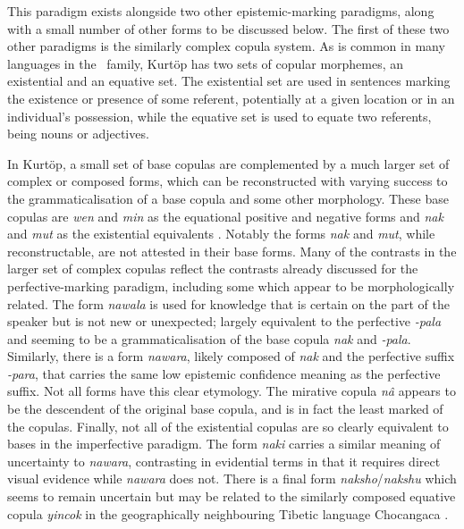 This paradigm exists alongside two other epistemic-marking paradigms, along with a small number of other forms to be discussed below. The first of these two other paradigms is the similarly complex copula system. As is common in many languages in the \lfam\ family, Kurtöp has two sets of copular morphemes, an existential and an equative set. The existential set are used in sentences marking the existence or presence of some referent, potentially at a given location or in an individual's possession, while the equative set is used to equate two referents, being nouns or adjectives.

In Kurtöp, a small set of base copulas are complemented by a much larger set of complex or composed forms, which can be reconstructed with varying success to the grammaticalisation of a base copula and some other morphology. These base copulas are \textit{wen} and \textit{min} as the equational positive and negative forms and \textit{nak} and \textit{mut} as the existential equivalents \cite[120]{Hyslop2014}. Notably the forms \textit{nak} and \textit{mut}, while reconstructable, are not attested in their base forms. Many of the contrasts in the larger set of complex copulas reflect the contrasts already discussed for the perfective-marking paradigm, including some which appear to be morphologically related. The form \textit{nawala} is used for knowledge that is certain on the part of the speaker but is not new or unexpected; largely equivalent to the perfective \textit{-pala} and seeming to be a grammaticalisation of the base copula \textit{nak} and \textit{-pala}. Similarly, there is a form \textit{nawara}, likely composed of \textit{nak} and the perfective suffix \textit{-para}, that carries the same low epistemic confidence meaning as the perfective suffix. Not all forms have this clear etymology. The mirative copula \textit{nâ} appears to be the descendent of the original base copula, and is in fact the least marked of the copulas. Finally, not all of the existential copulas are so clearly equivalent to bases in the imperfective paradigm. The form \textit{naki} carries a similar meaning of uncertainty to \textit{nawara}, contrasting in evidential terms in that it requires direct visual evidence while \textit{nawara} does not. There is a final form \textit{naksho}/\textit{nakshu} which seems to remain uncertain \cites[122]{Hyslop2014}[311]{Hyslop2017} but may be related to the similarly composed equative copula \textit{yincok} in the geographically neighbouring Tibetic language Chocangaca \cite{Bodnaruk2023a}.

